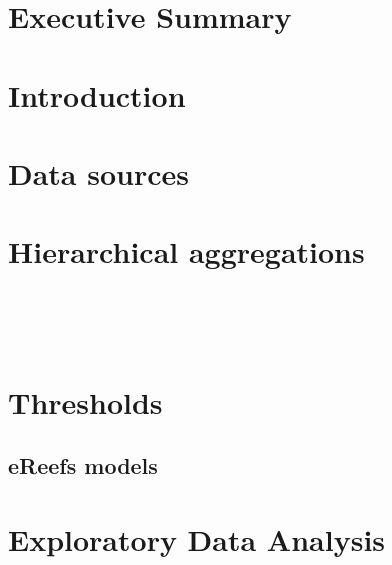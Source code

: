 \documentclass[a4paper]{AIMSreport}
\begin{document}


 
\section{Executive Summary}

\section{Introduction}

\section{Data sources}

%

  

 
 

 

\section{Hierarchical aggregations}

%
  
 
~\\[2em]



~\\[2em]
\setcounter{table}{0}
\setcounter{figure}{0}
\renewcommand{\thetable}{\Alph{section}\arabic{table}}
\renewcommand{\thefigure}{\Alph{section}\arabic{figure}}
 
   
\section{Thresholds} 

\clearpage

% 

\clearpage

\begin{landscape}       
\section{eReefs models}
 
%
\end{landscape}  
 
\clearpage 

\section{Exploratory Data Analysis}

%

 
\end{document}

